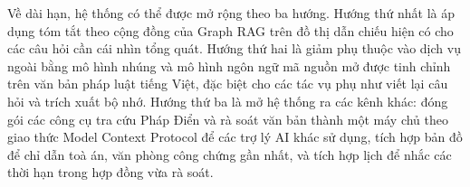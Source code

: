 \documentclass[../DoAn.tex]{subfiles}
\begin{document}
Về dài hạn, hệ thống có thể được mở rộng theo ba hướng. Hướng thứ nhất là áp dụng tóm tắt theo cộng đồng của Graph RAG \cite{edge2024graphrag} trên đồ thị dẫn chiếu hiện có cho các câu hỏi cần cái nhìn tổng quát. Hướng thứ hai là giảm phụ thuộc vào dịch vụ ngoài bằng mô hình nhúng và mô hình ngôn ngữ mã nguồn mở được tinh chỉnh trên văn bản pháp luật tiếng Việt, đặc biệt cho các tác vụ phụ như viết lại câu hỏi và trích xuất bộ nhớ. Hướng thứ ba là mở hệ thống ra các kênh khác: đóng gói các công cụ tra cứu Pháp Điển và rà soát văn bản thành một máy chủ theo giao thức Model Context Protocol để các trợ lý AI khác sử dụng, tích hợp bản đồ để chỉ dẫn toà án, văn phòng công chứng gần nhất, và tích hợp lịch để nhắc các thời hạn trong hợp đồng vừa rà soát.
\end{document}
